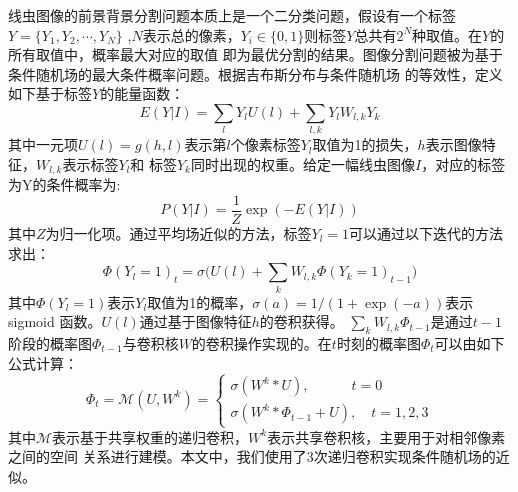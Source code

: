 	线虫图像的前景背景分割问题本质上是一个二分类问题，假设有一个标签$Y=\{Y_1,Y_2,\cdots,Y_N\}$
	,$N$表示总的像素，$Y_i\in\{0,1\}$则标签$Y$总共有$2^N$种取值。在$Y$的所有取值中，概率最大对应的取值
	即为最优分割的结果。图像分割问题被为基于条件随机场的最大条件概率问题。根据吉布斯分布与条件随机场
	的等效性\cite{Lafferty2001Conditional}，定义如下基于标签$Y$的能量函数：
	\begin{equation}
		E(Y|I) = \sum_{l}Y_lU(l)+\sum_{l,k}Y_lW_{l,k}Y_k
	\end{equation}
	其中一元项$U(l)=g(h,l)$表示第$l$个像素标签$Y_l$取值为1的损失，$h$表示图像特征，$W_{l,k}$表示标签$Y_l$和
	标签$Y_k$同时出现的权重。给定一幅线虫图像$I$，对应的标签为Y的条件概率为:
	\begin{equation}
		P(Y|I)=\frac{1}{Z}\exp(-E(Y|I))
	\end{equation}
	其中$Z$为归一化项。通过平均场近似\cite{zheng2015conditional}的方法，标签$Y_l=1$可以通过以下迭代的方法求出：
	\begin{equation}
		\Phi(Y_l=1)_t=\sigma\Big(U(l)+\sum_{k}W_{l,k}\Phi(Y_k=1)_{t-1}\Big)
	\end{equation}
	其中$\Phi(Y_l=1)$表示$Y_l$取值为1的概率，$\sigma(a)=1/(1+\exp(-a))$表示 sigmoid 函数。$U(l)$通过基于图像特征$h$的卷积获得。
	$\sum_{k}W_{l,k}\Phi_{t-1}$是通过$t-1$阶段的概率图$\Phi_{t-1}$与卷积核$W$的卷积操作实现的。在$t$时刻的概率图$\Phi_t$可以由如下公式计算：
	\begin{equation}
		\Phi_t=\mathscr{M}(U,W^k)=\begin{cases}
						\sigma(W^k*U), \quad \quad \quad t=0\\
						\sigma(W^k*\Phi_{t-1}+U), \quad t=1,2,3
						\end{cases}
	\end{equation}
	其中$\mathscr{M}$表示基于共享权重的递归卷积，$W^k$表示共享卷积核，主要用于对相邻像素之间的空间
	关系进行建模。本文中，我们使用了3次递归卷积实现条件随机场的近似。
	
	
